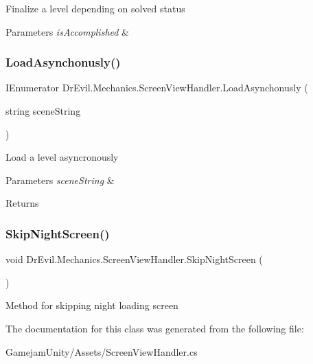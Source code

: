 Finalize a level depending on solved status 


\begin{DoxyParams}{Parameters}
{\em is\+Accomplished} & \\
\hline
\end{DoxyParams}
\mbox{\label{class_dr_evil_1_1_mechanics_1_1_screen_view_handler_a19aa48d532b54e268c6be5288bbbfeaf}} 
\subsubsection{\texorpdfstring{Load\+Asynchonusly()}{LoadAsynchonusly()}}
{\footnotesize\ttfamily I\+Enumerator Dr\+Evil.\+Mechanics.\+Screen\+View\+Handler.\+Load\+Asynchonusly (\begin{DoxyParamCaption}\item[{string}]{scene\+String }\end{DoxyParamCaption})\hspace{0.3cm}{\ttfamily [inline]}}



Load a level asyncronously 


\begin{DoxyParams}{Parameters}
{\em scene\+String} & \\
\hline
\end{DoxyParams}
\begin{DoxyReturn}{Returns}

\end{DoxyReturn}
\mbox{\label{class_dr_evil_1_1_mechanics_1_1_screen_view_handler_a24540cf0bdc0ebccedd905a7ed53a471}} 
\subsubsection{\texorpdfstring{Skip\+Night\+Screen()}{SkipNightScreen()}}
{\footnotesize\ttfamily void Dr\+Evil.\+Mechanics.\+Screen\+View\+Handler.\+Skip\+Night\+Screen (\begin{DoxyParamCaption}{ }\end{DoxyParamCaption})\hspace{0.3cm}{\ttfamily [inline]}}



Method for skipping night loading screen 



The documentation for this class was generated from the following file\+:\begin{DoxyCompactItemize}
\item 
Gamejam\+Unity/\+Assets/Screen\+View\+Handler.\+cs\end{DoxyCompactItemize}
